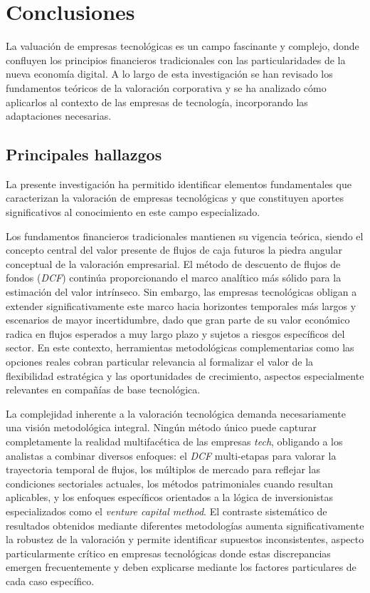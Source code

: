 \chapter{Conclusiones}

La valuación de empresas tecnológicas es un campo fascinante y complejo, donde confluyen los principios financieros tradicionales con las particularidades de la nueva economía digital. A lo largo de esta investigación se han revisado los fundamentos teóricos de la valoración corporativa y se ha analizado cómo aplicarlos al contexto de las empresas de tecnología, incorporando las adaptaciones necesarias.

\section{Principales hallazgos}

La presente investigación ha permitido identificar elementos fundamentales que caracterizan la valoración de empresas tecnológicas y que constituyen aportes significativos al conocimiento en este campo especializado.

Los fundamentos financieros tradicionales mantienen su vigencia teórica, siendo el concepto central del valor presente de flujos de caja futuros la piedra angular conceptual de la valoración empresarial. El método de descuento de flujos de fondos (\emph{DCF}) continúa proporcionando el marco analítico más sólido para la estimación del valor intrínseco. Sin embargo, las empresas tecnológicas obligan a extender significativamente este marco hacia horizontes temporales más largos y escenarios de mayor incertidumbre, dado que gran parte de su valor económico radica en flujos esperados a muy largo plazo y sujetos a riesgos específicos del sector. En este contexto, herramientas metodológicas complementarias como las opciones reales cobran particular relevancia al formalizar el valor de la flexibilidad estratégica y las oportunidades de crecimiento, aspectos especialmente relevantes en compañías de base tecnológica.

La complejidad inherente a la valoración tecnológica demanda necesariamente una visión metodológica integral. Ningún método único puede capturar completamente la realidad multifacética de las empresas \emph{tech}, obligando a los analistas a combinar diversos enfoques: el \emph{DCF} multi-etapas para valorar la trayectoria temporal de flujos, los múltiplos de mercado para reflejar las condiciones sectoriales actuales, los métodos patrimoniales cuando resultan aplicables, y los enfoques específicos orientados a la lógica de inversionistas especializados como el \emph{venture capital method}. El contraste sistemático de resultados obtenidos mediante diferentes metodologías aumenta significativamente la robustez de la valoración y permite identificar supuestos inconsistentes, aspecto particularmente crítico en empresas tecnológicas donde estas discrepancias emergen frecuentemente y deben explicarse mediante los factores particulares de cada caso específico.

